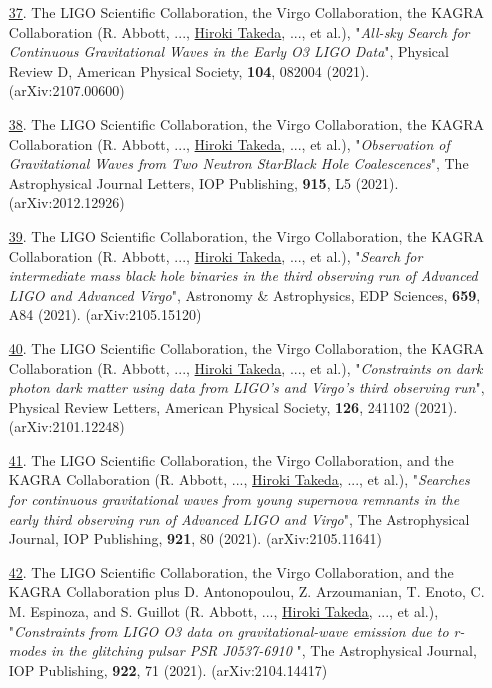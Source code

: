 \documentclass[uplatex, 12pt]{article}
\begin{document}
\begin{enumerate}
\item[\uline{37}.] The LIGO Scientific Collaboration, the Virgo Collaboration, the KAGRA Collaboration (R. Abbott, ..., \uline{Hiroki Takeda}, ..., et al.), "\emph{All-sky Search for Continuous Gravitational Waves in the Early O3 LIGO Data}", Physical Review D, American Physical Society, {\bf 104}, 082004 (2021). (arXiv:2107.00600)\\

\item[\uline{38}.] The LIGO Scientific Collaboration, the Virgo Collaboration, the KAGRA Collaboration (R. Abbott, ..., \uline{Hiroki Takeda}, ..., et al.), "\emph{Observation of Gravitational Waves from Two Neutron StarBlack Hole Coalescences}", The Astrophysical Journal Letters, IOP Publishing, {\bf 915}, L5 (2021). (arXiv:2012.12926)\\

\item[\uline{39}.] The LIGO Scientific Collaboration, the Virgo Collaboration, the KAGRA Collaboration (R. Abbott, ..., \uline{Hiroki Takeda}, ..., et al.), "\emph{Search for intermediate mass black hole binaries in the third observing run of Advanced LIGO and Advanced Virgo}", Astronomy \& Astrophysics, EDP Sciences, {\bf 659}, A84 (2021). (arXiv:2105.15120)\\

\item[\uline{40}.] The LIGO Scientific Collaboration, the Virgo Collaboration, the KAGRA Collaboration (R. Abbott, ..., \uline{Hiroki Takeda}, ..., et al.), "\emph{Constraints on dark photon dark matter using data from LIGO's and Virgo's third observing run}", Physical Review Letters, American Physical Society, {\bf 126}, 241102 (2021). (arXiv:2101.12248)\\

\item[\uline{41}.] The LIGO Scientific Collaboration, the Virgo Collaboration, and the KAGRA Collaboration (R. Abbott, ..., \uline{Hiroki Takeda}, ..., et al.), "\emph{Searches for continuous gravitational waves from young supernova remnants in the early third observing run of Advanced LIGO and Virgo}", The Astrophysical Journal, IOP Publishing, {\bf 921}, 80 (2021). (arXiv:2105.11641)\\

\item[\uline{42}.] The LIGO Scientific Collaboration, the Virgo Collaboration, and the KAGRA Collaboration plus D. Antonopoulou, Z. Arzoumanian, T. Enoto, C. M. Espinoza, and S. Guillot (R. Abbott, ..., \uline{Hiroki Takeda}, ..., et al.), "\emph{Constraints from LIGO O3 data on gravitational-wave emission due to r-modes in the glitching pulsar PSR J0537-6910 }", The Astrophysical Journal, IOP Publishing, {\bf 922}, 71 (2021). (arXiv:2104.14417)\\


\end{enumerate}
\end{document}
